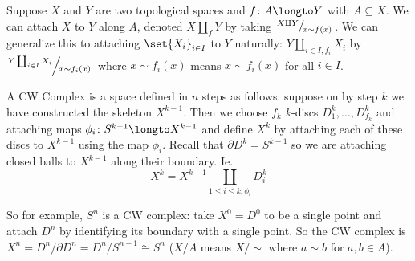 \bdefn

    Suppose $X$ and $Y$ are two topological spaces and $f\colon A\longto Y$ with $A\subseteq X$.
    We can {\emphcolor attach} $X$ to $Y$ along $A$, denoted $X\amalg_fY$ by taking $\slfrac{X\amalg Y}{x\sim f(x)}$.
    We can generalize this to attaching $\set{X_i}_{i\in I}$ to $Y$ naturally: $Y\coprod_{i\in I,f_i}X_i$ by $\slfrac{Y\coprod_{i\in I}X_i}{x\sim f_i(x)}$ where $x\sim f_i(x)$ means $x\sim f_i(x)$ for all
    $i\in I$.

\edefn

\bdefn

    A {\emphcolor CW Complex} is a space defined in $n$ steps as follows: suppose on by step $k$ we have constructed the skeleton $X^{k-1}$.
    Then we choose $f_k$ $k$-discs $D^k_1,\dots,D^k_{f_k}$ and attaching maps $\phi_i\colon S^{k-1}\longto X^{k-1}$ and define $X^k$ by attaching each of these discs to $X^{k-1}$ using the map $\phi_i$.
    Recall that $\partial D^k=S^{k-1}$ so we are attaching closed balls to $X^{k-1}$ along their boundary.
    Ie.
    $$ X^k = X^{k-1}\coprod_{1\leq i\leq k,\phi_i}D^k_i $$

\edefn

So for example, $S^n$ is a CW complex: take $X^0=D^0$ to be a single point and attach $D^n$ by identifying its boundary with a single point.
So the CW complex is $X^n=D^n/\partial D^n=D^n/S^{n-1}\cong S^n$ ($X/A$ means $X/{\sim}$ where $a\sim b$ for $a,b\in A$).


